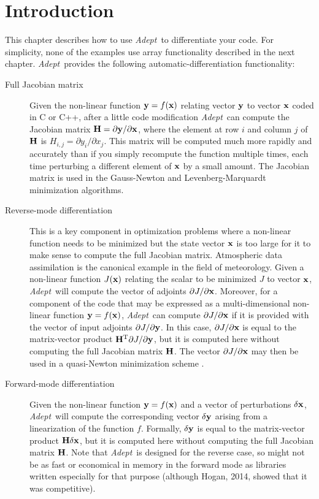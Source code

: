 \documentclass[a4,oneside]{book}
\def\x{\ensuremath{{\bf x}}}
\def\y{\ensuremath{{\bf y}}}
\def\H{\ensuremath{{\bf H}}}
\def\T{\ensuremath{^\mathrm{T}}}
\def\Adept{\emph{Adept}}
\begin{document}
\section{Introduction}
\label{sec:ad_functionality}
This chapter describes how to use \Adept\ to differentiate your code.
For simplicity, none of the examples use array functionality described
in the next chapter. \Adept\ provides the following
automatic-differentiation functionality:
%
\begin{description}
\item[Full Jacobian matrix] Given the non-linear function $\y=f(\x)$
  relating vector $\y$ to vector $\x$ coded in C or C++, after a
  little code modification \Adept\ can compute the Jacobian matrix
  $\H=\partial\y/\partial\x$, where the element at row $i$ and column $j$ of
  $\H$ is $H_{i,j}=\partial y_i/\partial x_j$. This matrix will be
  computed much more rapidly and accurately than if you simply
  recompute the function multiple times, each time perturbing a
  different element of $\x$ by a small amount. The Jacobian matrix is
  used in the Gauss-Newton and Levenberg-Marquardt minimization
  algorithms.
\item[Reverse-mode differentiation] This is a key component in
  optimization problems where a non-linear function needs to be
  minimized but the state vector $\x$ is too large for it to make
  sense to compute the full Jacobian matrix. Atmospheric data
  assimilation is the canonical example in the field of
  meteorology. Given a non-linear function $J(\x)$ relating the
  scalar to be minimized $J$ to vector $\x$, \Adept\ will compute the
  vector of adjoints $\partial J/\partial\x$. Moreover, for a
  component of the code that may be expressed as a multi-dimensional
  non-linear function $\y=f(\x)$, \Adept\ can compute $\partial
  J/\partial\x$ if it is provided with the vector of input adjoints
  $\partial J/\partial\y$.  In this case, $\partial J/\partial\x$ is
  equal to the matrix-vector product $\H\T\partial J/\partial\y$, but
  it is computed here without computing the full Jacobian matrix
  $\H$. The vector $\partial J/\partial\x$ may then be used in a
  quasi-Newton minimization scheme \cite[e.g.,][]{Liu+1989}.
\item[Forward-mode differentiation] Given the non-linear function
  $\y=f(\x)$ and a vector of perturbations $\delta\x$, \Adept\ will
  compute the corresponding vector $\delta\y$ arising from a
  linearization of the function $f$. Formally, $\delta\y$ is equal
  to the matrix-vector product $\H\delta\x$, but it is computed here
  without computing the full Jacobian matrix $\H$. Note that
  \Adept\ is designed for the reverse case, so might not be as fast
  or economical in memory in the forward mode as libraries written
  especially for that purpose (although Hogan, 2014, showed that it
  was competitive).
\end{description}%
\end{document}
